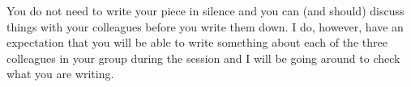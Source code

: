 \documentclass[a4paper]{article}
\begin{document}
You do not need to write your piece in silence and you can (and should) discuss things with your colleagues before you write them down.  I do, however, have an expectation that you will be able to 
write something about each of the three colleagues in your group during the session and I will be going around to check what you are writing.
\end{document}
